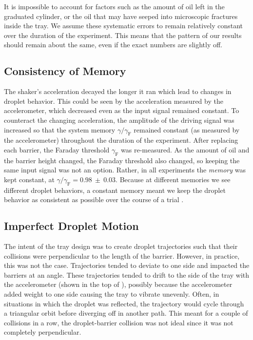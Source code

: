 It is impossible to account for factors such as the amount of oil left in the graduated cylinder, or the oil that may have seeped into microscopic fractures inside the tray. We assume these systematic errors to remain relatively constant over the duration of the experiment. This means that the pattern of our results should remain about the same, even if the exact numbers are slightly off. 

    \subsection{Consistency of Memory}
The shaker's acceleration decayed the longer it ran which lead to changes in droplet behavior. This could be seen by the acceleration measured by the accelerometer, which decreased even as the input signal remained constant. To counteract the changing acceleration, the amplitude of the driving signal was increased so that the system memory $\gamma/\gamma_\mathrm{F}$ remained constant (as measured by the accelerometer) throughout the duration of the experiment. After replacing each barrier, the Faraday threshold $\gamma_\mathrm{F}$ was re-measured. As the amount of oil and the barrier height changed, the Faraday threshold also changed, so keeping the same input signal was not an option. Rather, in all experiments the \textit{memory} was kept constant, at $\gamma/\gamma_\mathrm{F} = \mathbf{0.98~\pm~0.03}$. Because at different memories we see different droplet behaviors, a constant memory meant we keep the droplet behavior as consistent as possible over the course of a trial . 

    \subsection{Imperfect Droplet Motion}
The intent of the tray design was to create droplet trajectories such that their collisions were perpendicular to the length of the barrier. However, in practice, this was not the case. Trajectories tended to deviate to one side and impacted the barriers at an angle. These trajectories tended to drift to the side of the tray with the accelerometer (shown in the top of ), possibly because the accelerometer added weight to one side causing the tray to vibrate unevenly. Often, in situations in which the droplet was reflected, the trajectory would cycle through a triangular orbit before diverging off in another path. This meant for a couple of collisions in a row, the droplet-barrier collision was not ideal since it was not completely perpendicular.

